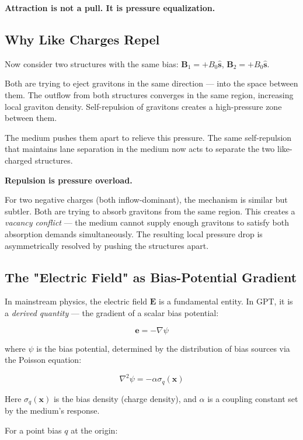 \documentclass[12pt, a4paper]{article}
\begin{document}
\textbf{Attraction is not a pull. It is pressure equalization.}

\subsection{Why Like Charges Repel}
\label{subsec:like_repel}

Now consider two structures with the same bias: \( \mathbf{B}_1 = +B_0 \hat{\mathbf{s}} \), \( \mathbf{B}_2 = +B_0 \hat{\mathbf{s}} \).

Both are trying to eject gravitons in the same direction — into the space between them. The outflow from both structures converges in the same region, increasing local graviton density. Self-repulsion of gravitons creates a high-pressure zone between them.

The medium pushes them apart to relieve this pressure. The same self-repulsion that maintains lane separation in the medium now acts to separate the two like-charged structures.

\textbf{Repulsion is pressure overload.}

For two negative charges (both inflow-dominant), the mechanism is similar but subtler. Both are trying to absorb gravitons from the same region. This creates a \textit{vacancy conflict} — the medium cannot supply enough gravitons to satisfy both absorption demands simultaneously. The resulting local pressure drop is asymmetrically resolved by pushing the structures apart.

\subsection{The "Electric Field" as Bias-Potential Gradient}
\label{subsec:electric_field}

In mainstream physics, the electric field \( \mathbf{E} \) is a fundamental entity. In GPT, it is a \textit{derived quantity} — the gradient of a scalar bias potential:

\[
\mathbf{e} = -\nabla \psi
\]

where \( \psi \) is the bias potential, determined by the distribution of bias sources via the Poisson equation:

\[
\nabla^2 \psi = -\alpha \sigma_q(\mathbf{x})
\]

Here \( \sigma_q(\mathbf{x}) \) is the bias density (charge density), and \( \alpha \) is a coupling constant set by the medium's response.

For a point bias \( q \) at the origin:
\end{document}
